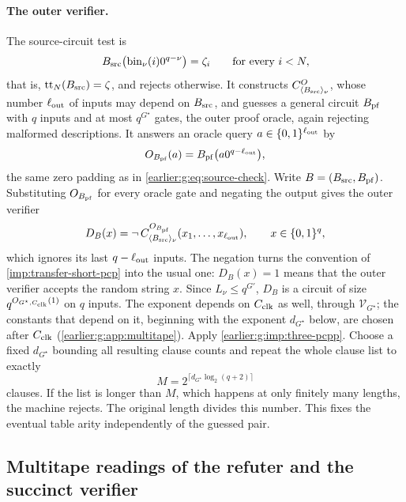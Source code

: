 \paragraph{The outer verifier.}
The source-circuit test is
\begin{equation}\label{earlier:g:eq:source-check}
 B_{\rm src}\bigl(\mathrm{bin}_\nu(i)0^{q-\nu}\bigr)=\zeta_i
 \qquad\text{for every }i<N,
\end{equation}
that is, $\mathrm{tt}_N(B_{\rm src})=\zeta$, and rejects otherwise. It
constructs $C^O_{\langle B_{\rm src}\rangle_\nu}$, whose number
$\ell_{\rm out}$ of inputs may depend on $B_{\rm src}$, and guesses a
general circuit $B_{\rm pf}$ with $q$ inputs and at most $q^{G^\star}$ gates,
the outer proof oracle, again rejecting malformed descriptions. It
answers an oracle query $a\in\{0,1\}^{\ell_{\rm out}}$ by
\[
 O_{B_{\rm pf}}(a)=B_{\rm pf}\bigl(a0^{q-\ell_{\rm out}}\bigr),
\]
the same zero padding as in \eqref{earlier:g:eq:source-check}. Write
$B=(B_{\rm src},B_{\rm pf})$. Substituting $O_{B_{\rm pf}}$ for every
oracle gate and negating the output gives the outer verifier
\[
 D_B(x)=\neg\,C^{O_{B_{\rm pf}}}_{\langle B_{\rm src}\rangle_\nu}
 (x_1,\ldots,x_{\ell_{\rm out}}),\qquad x\in\{0,1\}^q,
\]
which ignores its last $q-\ell_{\rm out}$ inputs. The negation turns
the convention of \cref{imp:transfer-short-pcp} into the usual one: $D_B(x)=1$
means that the outer verifier accepts the random string $x$. Since
$L_\nu\le q^{G'}$, $D_B$ is a circuit of size $q^{O_{{G^\star},C_{\rm clk}}(1)}$ on $q$
inputs. The exponent depends on $C_{\rm clk}$ as well, through
$\mathcal V_{{G^\star}}$; the constants that depend on
it, beginning with the exponent $d_{{G^\star}}$ below, are chosen after
$C_{\rm clk}$ (\cref{earlier:g:app:multitape}). Apply \cref{earlier:g:imp:three-pcpp}. Choose a fixed $d_{{G^\star}}$ bounding
all resulting clause counts and repeat the whole clause list to
exactly
\[
 M=2^{\lceil d_{{G^\star}}\log_2(q+2)\rceil}
\]
clauses. If the list is longer than $M$, which happens at only
finitely many lengths, the machine rejects. The original length divides
this number. This fixes the eventual table arity independently of the
guessed pair.


\subsection{Multitape readings of the refuter and the succinct verifier}\label{earlier:r:app:multitape}\label{earlier:g:app:multitape}\label{earlier:gate-models}


